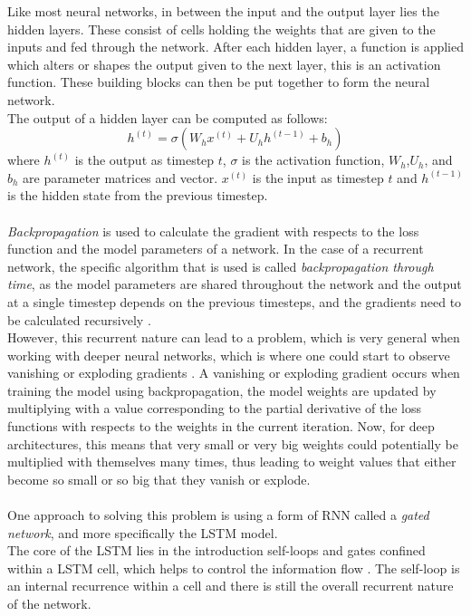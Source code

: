 \documentclass[main.tex]{subfiles}
\begin{document}
Like most neural networks, in between the input and the output layer lies the hidden layers. These consist of cells holding the weights that are given to the inputs and fed through the network. After each hidden layer, a function is applied which alters or shapes the output given to the next layer, this is an activation function. These building blocks can then be put together to form the neural network.\\
The output of a hidden layer can be computed as follows:
$$ h^{(t)} = \sigma(W_hx^{(t)} + U_hh^{(t-1)} + b_h)$$
where $h^{(t)}$ is the output as timestep \textit{$t$}, $\sigma$ is the activation function, $W_h$,$U_h$, and $b_h$ are parameter matrices and vector. $x^{(t)}$ is the input as timestep \textit{$t$} and $h^{(t-1)}$ is the hidden state from the previous timestep.\\
\\
\textit{Backpropagation} is used to calculate the gradient with respects to the loss function and the model parameters of a network. In the case of a recurrent network, the specific algorithm that is used is called \textit{backpropagation through time}, as the model parameters are shared throughout the network and the output at a single timestep depends on the previous timesteps, and the gradients need to be calculated recursively \cite{Goodfellow-et-al-2016}.\\
However, this recurrent nature can lead to a problem, which is very general when working with deeper neural networks, which is where one could start to observe vanishing or exploding gradients \cite{Goodfellow-et-al-2016}. A vanishing or exploding gradient occurs when training the model using backpropagation, the model weights are updated by multiplying with a value corresponding to the partial derivative of the loss functions with respects to the weights in the current iteration. Now, for deep architectures, this means that very small or very big weights could potentially be multiplied with themselves many times, thus leading to weight values that either become so small or so big that they vanish or explode\cite{Goodfellow-et-al-2016}.\\
\\
One approach to solving this problem is using a form of RNN called a \textit{gated network}, and more specifically the LSTM model.\\
The core of the LSTM lies in the introduction self-loops and gates confined within a LSTM cell, which helps to control the information flow \cite{Goodfellow-et-al-2016}. The self-loop is an internal recurrence within a cell and there is still the overall recurrent nature of the network. 
\end{document}
